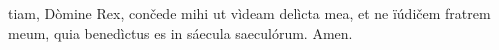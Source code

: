 tiam, Dòmine Rex, cončede mihi ut vìdeam delìcta mea, et ne ïúdičem fratrem meum, quia benedìctus es in sáecula saeculórum. Amen.
